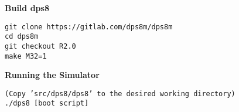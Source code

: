 \textbf{Build dps8}

\begin{adjustwidth}{5ex}{1ex}
    \texttt{git clone https://gitlab.com/dps8m/dps8m} \\
    \texttt{cd dps8m} \\
    \texttt{git checkout R2.0} \\
    \texttt{make M32=1} \\
\end{adjustwidth}  

\textbf{Running the Simulator}

\begin{adjustwidth}{5ex}{1ex}
    \texttt{(Copy 'src/dps8/dps8' to the desired working directory)} \\
    \texttt{./dps8 [boot script]} \\
\end{adjustwidth}  

